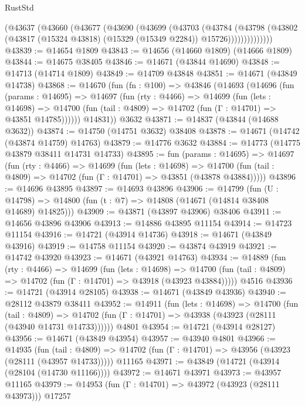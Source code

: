 \begin{lexlean}{RustStd}
\begin{coremodule}
            (@43637
              (@43660
                (@43677
                  (@43690
                    (@43699
                      (@43703
                        (@43784
                          (@43798
                            (@43802
                              (@43817 (@15324 @43818) (@15329 (@15349 @2284)) @15726))))))))))))))
@43839 := @14654 @1809
@43843 := @14656 (@14660 @1809) (@14666 @1809)
@43844 := @14675 @38405
@43846 := @14671 (@43844 @14690)
@43848 := @14713 (@14714 @1809)
@43849 := @14709 @43848
@43851 := @14671 (@43849 @14738)
@43868 := @14670
    (fun (fn : @100) =>
    @43846
      (@14693
        (@14696
          (fun (params : @14695) =>
          @14697
            (fun (rty : @4466) =>
            @14699
              (fun (lets : @14698) =>
              @14700 (fun (tail : @4809) => @14702 (fun (Γ : @14701) => @43851 @14785))))))
        @14831))
    @3632
@43871 := @14837 (@43844 (@14688 @3632))
@43874 := @14750 (@14751 @3632) @38408
@43878 := @14671 (@14742 (@43874 @14759) @14763)
@43879 := @14776 @3632
@43884 := @14773 (@14775 @43879 @38411 @14731 @14733)
@43895 := fun (params : @14695) =>
  @14697
    (fun (rty : @4466) =>
    @14699
      (fun (lets : @14698) =>
      @14700 (fun (tail : @4809) => @14702 (fun (Γ : @14701) => @43851 (@43878 @43884)))))
@43896 := @14696 @43895
@43897 := @14693 @43896
@43906 := @14799
    (fun (U : @14798) => @14800 (fun (t : @7) => @14808 (@14671 (@14814 @38408 @14689) @14825)))
@43909 := @43871 (@43897 @43906) @38406
@43911 := @14656 @43896 @43906
@43913 := @14886 @43895 @11154
@43914 := @14723 @11154
@43916 := @14721 (@43914 @14736)
@43918 := @14671 (@43849 @43916)
@43919 := @14758 @11154
@43920 := @43874 @43919
@43921 := @14742 @43920
@43923 := @14671 (@43921 @14763)
@43934 := @14889
    (fun (rty : @4466) =>
    @14699
      (fun (lets : @14698) =>
      @14700 (fun (tail : @4809) => @14702 (fun (Γ : @14701) => @43918 (@43923 @43884)))))
    @4516
@43936 := @14721 (@43914 @28105)
@43938 := @14671 (@43849 @43936)
@43940 := @28112 @43879 @38411
@43952 := @14911
    (fun (lets : @14698) =>
    @14700
      (fun (tail : @4809) =>
      @14702 (fun (Γ : @14701) => @43938 (@43923 (@28111 (@43940 @14731 @14733))))))
    @4801
@43954 := @14721 (@43914 @28127)
@43956 := @14671 (@43849 @43954)
@43957 := @43940 @4801
@43966 := @14935
    (fun (tail : @4809) => @14702 (fun (Γ : @14701) => @43956 (@43923 (@28111 (@43957 @14733)))))
    @11165
@43971 := @43849 (@14721 (@43914 (@28104 (@14730 @11166))))
@43972 := @14671 @43971
@43973 := @43957 @11165
@43979 := @14953 (fun (Γ : @14701) => @43972 (@43923 (@28111 @43973))) @17257

\end{coremodule}
\end{lexlean}
